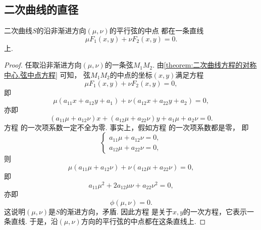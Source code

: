 \subsection{二次曲线的直径}
\begin{theorem}\label{theorem:二次曲线方程的直径和对称轴.二次曲线沿非渐进方向的平行弦的中垂线}
二次曲线\(S\)的沿非渐进方向\((\mu,\nu)\)的平行弦的中点
都在一条直线\begin{equation}\label{equation:二次曲线方程的直径和对称轴.二次曲线沿非渐进方向的平行弦的中垂线1}
	\mu F_1(x,y) + \nu F_2(x,y) = 0.
\end{equation}上.
\begin{proof}
任取沿非渐进方向\((\mu,\nu)\)的一条弦\(M_1 M_2\).
由\cref{theorem:二次曲线方程的对称中心.弦中点方程} 可知，
弦\(M_1 M_2\)的中点的坐标\((x,y)\)满足方程\begin{equation*}
	\mu F_1(x,y) + \nu F_2(x,y) = 0,
\end{equation*}
即\begin{equation*}
	\mu (a_{11} x + a_{12} y + a_1) + \nu (a_{12} x + a_{22} y + a_2) = 0,
\end{equation*}
亦即\begin{equation}\label{equation:二次曲线方程的直径和对称轴.二次曲线沿非渐进方向的平行弦的中垂线2}
	(a_{11} \mu + a_{12} \nu) x
	+ (a_{12} \mu + a_{22} \nu) y
	+ a_1 \mu + a_2 \nu
	= 0.
\end{equation}
方程  的一次项系数一定不全为零.
事实上，假如方程  的一次项系数都是零，
即\begin{equation*}
	\left\{ \begin{array}{l}
		a_{11} \mu + a_{12} \nu = 0, \\
		a_{12} \mu + a_{22} \nu = 0,
	\end{array} \right.
\end{equation*}
则\begin{equation*}
	\mu (a_{11} \mu + a_{12} \nu) + \nu (a_{12} \mu + a_{22} \nu) = 0,
\end{equation*}
即\begin{equation*}
	a_{11} \mu^2 + 2 a_{12} \mu \nu + a_{22} \nu^2 = 0,
\end{equation*}
亦即\begin{equation*}
	\phi(\mu,\nu) = 0.
\end{equation*}
这说明\((\mu,\nu)\)是\(S\)的渐进方向，矛盾.
因此方程 
是关于\(x,y\)的一次方程，它表示一条直线.
于是，沿\((\mu,\nu)\)方向的平行弦的中点都在这条直线上.
\end{proof}
\end{theorem}

